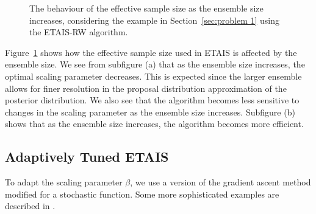 \documentclass[final]{siamltex}
\begin{document}
\begin{figure}[htb]
\centering
{}
\caption{The behaviour of the effective sample size as the ensemble
  size increases, considering the example in Section~\ref{sec:problem 1} using the ETAIS-RW algorithm.}
\label{fig:neff-M}
\end{figure}

Figure~\ref{fig:neff-M} shows how the effective sample size used in
ETAIS is affected by the ensemble size. We see from subfigure (a) that
as the ensemble size increases, the optimal scaling parameter
decreases. This is expected since the larger ensemble allows for
finer resolution in the proposal distribution approximation of the
posterior distribution. We also
see that the algorithm becomes less sensitive to changes in the
scaling parameter as the ensemble size increases. Subfigure (b) shows
that as the ensemble size increases, the algorithm becomes more
efficient.

\subsection{Adaptively Tuned ETAIS}\label{sec:adapt}

To adapt the scaling parameter $\beta$, we use a version of the
gradient ascent method modified for a stochastic function. Some more
sophisticated examples are described in
\cite{roberts2009examples,Ji2013adaptive,andrieu2006ergodicity}.
\end{document}
